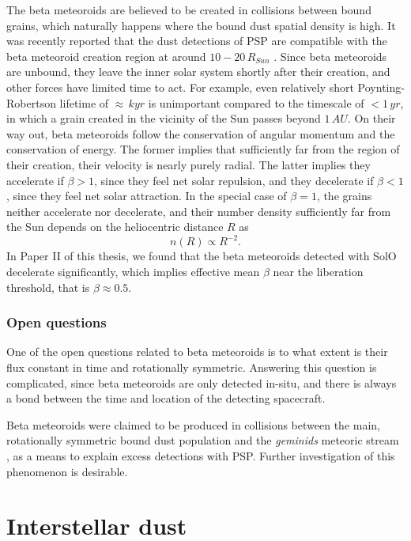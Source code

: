 The beta meteoroids are believed to be created in collisions between bound grains, which naturally happens where the bound dust spatial density is high. It was recently reported that the dust detections of PSP are compatible with the beta meteoroid creation region at around $10 - 20 \, R_{Sun}$ \citep{szalay2021collisional}. Since beta meteoroids are unbound, they leave the inner solar system shortly after their creation, and other forces have limited time to act. For example, even relatively short Poynting-Robertson lifetime of $\approx \, kyr$ is unimportant compared to the timescale of $< 1 \, \si{yr}$, in which a grain created in the vicinity of the Sun passes beyond $1 \, \si{AU}$. On their way out, beta meteoroids follow the conservation of angular momentum and the conservation of energy. The former implies that sufficiently far from the region of their creation, their velocity is nearly purely radial. The latter implies they accelerate if $\beta > 1$, since they feel net solar repulsion, and they decelerate if $\beta < 1$, since they feel net solar attraction. In the special case of $\beta=1$, the grains neither accelerate nor decelerate, and their number density sufficiently far from the Sun depends on the heliocentric distance $R$ as
\begin{equation}
    n(R) \propto R^{-2}. \label{eq:beta_number_density}
\end{equation}
In Paper II of this thesis, we found that the beta meteoroids detected with SolO decelerate significantly, which implies effective mean $\beta$ near the liberation threshold, that is $\beta \approx 0.5$. 

\subsubsection{Open questions}

One of the open questions related to beta meteoroids is to what extent is their flux constant in time and rotationally symmetric. Answering this question is complicated, since beta meteoroids are only detected in-situ, and there is always a bond between the time and location of the detecting spacecraft. 

Beta meteoroids were claimed to be produced in collisions between the main, rotationally symmetric bound dust population and the \textit{geminids} meteoric stream \citep{szalay2021collisional}, as a means to explain excess detections with PSP. Further investigation of this phenomenon is desirable.

\section{Interstellar dust}

